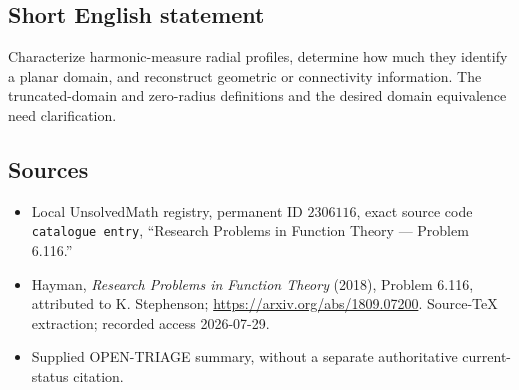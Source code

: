 \documentclass[11pt]{article}
\begin{document}
\subsection{Short English statement}
Characterize harmonic-measure radial profiles, determine how much they identify a planar domain, and reconstruct geometric or connectivity information. The truncated-domain and zero-radius definitions and the desired domain equivalence need clarification.
\subsection{Sources}
\begin{itemize}
\item Local UnsolvedMath registry, permanent ID \(2306116\), exact source code \texttt{catalogue entry}, ``Research Problems in Function Theory --- Problem 6.116.''
\item Hayman, \emph{Research Problems in Function Theory} (2018), Problem 6.116, attributed to K. Stephenson; \url{https://arxiv.org/abs/1809.07200}. Source-TeX extraction; recorded access 2026-07-29.
\item Supplied OPEN-TRIAGE summary, without a separate authoritative current-status citation.
\end{itemize}
\end{document}
